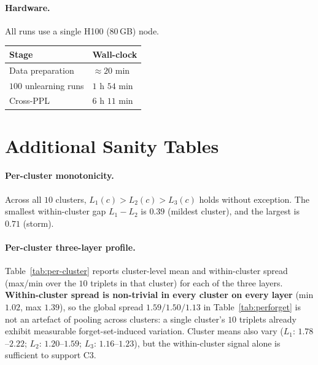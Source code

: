 \documentclass[11pt]{article}
\newcommand{\Lone}{L_1}
\newcommand{\Ltwo}{L_2}
\newcommand{\Lthree}{L_3}
\begin{document}
\paragraph{Hardware.} All runs use a single H100 (80\,GB) node.
\begin{center}
\footnotesize
\begin{tabular}{@{}ll@{}}
    \toprule
    Stage & Wall-clock \\
    \midrule
    Data preparation & $\approx 20$ min \\
    $100$ unlearning runs & $1$ h $54$ min \\
    Cross-PPL & $6$ h $11$ min \\
    \bottomrule
\end{tabular}
\end{center}

\section{Additional Sanity Tables}
\label{app:tables}

\paragraph{Per-cluster monotonicity.} Across all $10$ clusters,
$\Lone(c){>}\Ltwo(c){>}\Lthree(c)$ holds without exception. The smallest
within-cluster gap $\Lone{-}\Ltwo$ is $0.39$ (mildest cluster), and the largest
is $0.71$ (storm).

\paragraph{Per-cluster three-layer profile.}
Table~\ref{tab:per-cluster} reports cluster-level mean and within-cluster
spread (max/min over the $10$ triplets in that cluster) for each of the three
layers. \textbf{Within-cluster spread is non-trivial in every cluster on every
layer} (min $1.02$, max $1.39$), so the global spread $1.59 / 1.50 / 1.13$
in Table~\ref{tab:perforget} is not an artefact of pooling across clusters: a
single cluster's $10$ triplets already exhibit measurable forget-set-induced
variation. Cluster means also vary ($\Lone$: $1.78$--$2.22$; $\Ltwo$:
$1.20$--$1.59$; $\Lthree$: $1.16$--$1.23$), but the within-cluster signal alone
is sufficient to support C3.
\end{document}
